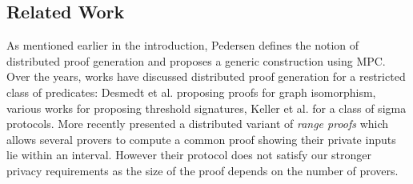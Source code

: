 {%
%
%
\subsection{Related Work}\label{sec:relatedwork}
As mentioned earlier in the introduction, Pedersen \cite{Ped92} defines the
notion of distributed proof generation and proposes a generic construction using
MPC. Over the years, works have discussed distributed proof generation for a
restricted class of predicates: Desmedt et al. \cite{DDB94} proposing proofs for
graph isomorphism, various works \cite{King05, DDS, Desmedt2011} for proposing
threshold signatures, Keller et al. \cite{EfficientTZ} for a class of sigma
protocols. 
{\color{blue} More recently \cite{bulletproofs} presented a distributed variant of {\em range proofs} which allows
several provers to compute a common proof showing their private inputs lie within an interval. However their protocol
does not satisfy our stronger privacy requirements as the size of the proof depends on the number of provers.}

}
